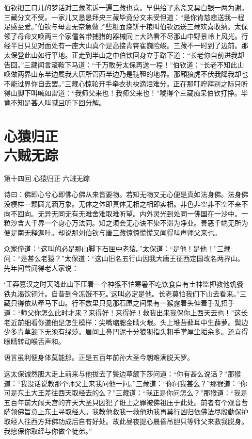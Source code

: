\documentclass[12pt,UTF8]{ctexbook}
\begin{document}
{伯钦把三口儿的梦话对三藏陈诉一遍三藏也喜。早供给了素斋又具白银一两为谢。三藏分文不受。一家儿又恳恳拜央三藏毕竟分文未受但道：“是你肯慈悲送我一程足感至爱。”伯钦与母妻无奈急做了些粗面烧饼干粮叫伯钦远送三藏欢喜收纳。太保领了母命又唤两三个家僮各带捕猎的器械同上大路看不尽那山中野景岭上风光。行经半日只见对面处有一座大山真个是高接青霄崔巍险峻。三藏不一时到了边前。那太保登此山如行平地。正走到半山之中伯钦回身立于路下道：“长老你自前进我却告回。”三藏闻言滚鞍下马道：“千万敢劳太保再送一程！”伯钦道：“长老不知此山唤做两界山东半边属我大唐所管西半边乃是鞑靼的地界。那厢狼虎不伏我降我却也不能过界你自去罢。”三藏心惊轮开手牵衣执袂滴泪难分。正在那叮咛拜别之际只听得山脚下叫喊如雷道：“我师父来也！我师父来也！”唬得个三藏痴呆伯钦打挣。毕竟不知是甚人叫喊且听下回分解。

\chapter[心猿归正\ 六贼无踪]{心猿归正\\六贼无踪}

第十四回 心猿归正 六贼无踪

诗曰：佛即心兮心即佛心佛从来皆要物。若知无物又无心便是真如法身佛。法身佛没模样一颗圆光涵万象。无体之体即真体无相之相即实相。非色非空非不空不来不向不回向。无异无同无有无难舍难取难听望。内外灵光到处同一佛国在一沙中。一粒沙含大千界一个身心万法同。知之须会无心诀不染不滞为净业。善恶千端无所为便是南无释迦叶。却说那刘伯钦与唐三藏惊惊慌慌又闻得叫声师父来也。

众家僮道：“这叫的必是那山脚下石匣中老猿。”太保道：“是他！是他！”三藏问：“是甚么老猿？”太保道：“这山旧名五行山因我大唐王征西定国改名两界山。先年间曾闻得老人家说：

‘王莽篡汉之时天降此山下压着一个神猴不怕寒暑不吃饮食自有土神监押教他饥餐铁丸渴饮铜汁。自昔到今冻饿不死。’这叫必定是他。长老莫怕我们下山去看来。”三藏只得依从牵马下山。行不数里只见那石匣之间果有一猴露着头伸着手乱招手道：“师父你怎么此时才来？来得好！来得好！救我出来我保你上西天去也！”这长老近前细看你道他是怎生模样：尖嘴缩腮金睛火眼。头上堆苔藓耳中生薜萝。鬓边少多青草颔下无须有绿莎。眉间土鼻凹泥十分狼狈指头粗手掌厚尘垢余多。还喜得眼睛转动喉舌声和。

语言虽利便身体莫能那。正是五百年前孙大圣今朝难满脱天罗。

这太保诚然胆大走上前来与他拔去了鬓边草颔下莎问道：“你有甚么说话？”那猴道：“我没话说教那个师父上来我问他一问。”三藏道：“你问我甚么？”那猴道：“你可是东土大王差往西天取经去的么？”三藏道：“我正是你问怎么？”那猴道：“我是五百年前大闹天宫的齐天大圣只因犯了诳上之罪被佛祖压于此处。前者有个观音菩萨领佛旨意上东土寻取经人。我教他救我一救他劝我再莫行凶归依佛法尽殷勤保护取经人往西方拜佛功成后自有好处。故此昼夜提心晨昏吊胆只等师父来救我脱身。我愿保你取经与你做个徒弟。”

}
\end{document}
